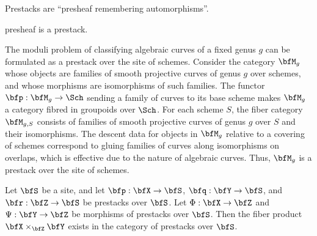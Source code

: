     \begin{slogan}\label{slogan:prestack_and_presheaf}
        Prestacks are ``presheaf remembering automorphisms''.
    \end{slogan}


    \begin{example}\label{eg:presheaf_is_prestack}
        presheaf is a prestack.
    \end{example}

    \begin{example}\label{eg:prestack_of_moduli_of_curves}
        The moduli problem of classifying algebraic curves of a fixed genus \(g\) can be formulated as a prestack over the site of schemes.
        Consider the category \(\bfM_g\) whose objects are families of smooth projective curves of genus \(g\) over schemes, and whose morphisms are isomorphisms of such families.
        The functor \(\bfp: \bfM_g \to \Sch\) sending a family of curves to its base scheme makes \(\bfM_g\) a category fibred in groupoids over \(\Sch\).
        For each scheme \(S\), the fiber category \(\bfM_{g,S}\) consists of families of smooth projective curves of genus \(g\) over \(S\) and their isomorphisms.
        The descent data for objects in \(\bfM_g\) relative to a covering of schemes correspond to gluing families of curves along isomorphisms on overlaps, which is effective due to the nature of algebraic curves.
        Thus, \(\bfM_g\) is a prestack over the site of schemes.
    \end{example}




    \begin{proposition}\label{prop:existence_of_fiber_product_of_prestacks}
        Let \(\bfS\) be a site, and let \(\bfp: \bfX \to \bfS\), \(\bfq: \bfY \to \bfS\), and \(\bfr: \bfZ \to \bfS\) be prestacks over \(\bfS\).
        Let \(\Phi: \bfX \to \bfZ\) and \(\Psi: \bfY \to \bfZ\) be morphisms of prestacks over \(\bfS\).
        Then the fiber product \(\bfX \times_{\bfZ} \bfY\) exists in the category of prestacks over \(\bfS\).
    \end{proposition}


